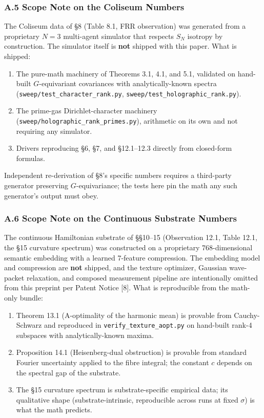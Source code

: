\documentclass[
  11pt,
]{article}
\providecommand{\tightlist}{%
  \setlength{\itemsep}{0pt}\setlength{\parskip}{0pt}}
\begin{document}
\subsubsection{A.5 Scope Note on the Coliseum
Numbers}\label{a.5-scope-note-on-the-coliseum-numbers}

The Coliseum data of §8 (Table 8.1, FRR observation) was generated from
a proprietary \(N = 3\) multi-agent simulator that respects \(S_N\)
isotropy by construction. The simulator itself is \textbf{not} shipped
with this paper. What is shipped:

\begin{enumerate}
\def\labelenumi{\arabic{enumi}.}
\tightlist
\item
  The pure-math machinery of Theorems 3.1, 4.1, and 5.1, validated on
  hand-built \(G\)-equivariant covariances with analytically-known
  spectra (\texttt{sweep/test\_character\_rank.py},
  \texttt{sweep/test\_holographic\_rank.py}).
\item
  The prime-gas Dirichlet-character machinery
  (\texttt{sweep/holographic\_rank\_primes.py}), arithmetic on its own
  and not requiring any simulator.
\item
  Drivers reproducing §6, §7, and §12.1--12.3 directly from closed-form
  formulas.
\end{enumerate}

Independent re-derivation of §8's specific numbers requires a
third-party generator preserving \(G\)-equivariance; the tests here pin
the math any such generator's output must obey.

\subsubsection{A.6 Scope Note on the Continuous Substrate
Numbers}\label{a.6-scope-note-on-the-continuous-substrate-numbers}

The continuous Hamiltonian substrate of §§10--15 (Observation 12.1,
Table 12.1, the §15 curvature spectrum) was constructed on a proprietary
768-dimensional semantic embedding with a learned 7-feature compression.
The embedding model and compression are \textbf{not} shipped, and the
texture optimizer, Gaussian wave-packet relaxation, and composed
measurement pipeline are intentionally omitted from this preprint per
Patent Notice {[}8{]}. What is reproducible from the math-only bundle:

\begin{enumerate}
\def\labelenumi{\arabic{enumi}.}
\tightlist
\item
  Theorem 13.1 (A-optimality of the harmonic mean) is provable from
  Cauchy-Schwarz and reproduced in \texttt{verify\_texture\_aopt.py} on
  hand-built rank-4 subspaces with analytically-known maxima.
\item
  Proposition 14.1 (Heisenberg-dual obstruction) is provable from
  standard Fourier uncertainty applied to the fibre integral; the
  constant \(c\) depends on the spectral gap of the substrate.
\item
  The §15 curvature spectrum is substrate-specific empirical data; its
  qualitative shape (substrate-intrinsic, reproducible across runs at
  fixed \(\sigma\)) is what the math predicts.
\end{enumerate}
\end{document}
